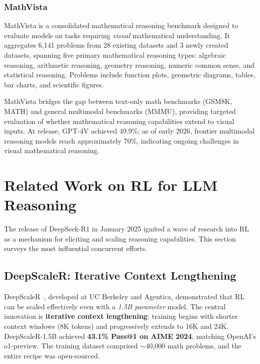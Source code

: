 \documentclass[12pt,a4paper]{report}
\theoremstyle{definition}
\begin{document}
\subsubsection{MathVista}

MathVista \cite{lu2024mathvista} is a consolidated mathematical reasoning benchmark designed to evaluate models on tasks requiring \emph{visual} mathematical understanding. It aggregates 6,141 problems from 28 existing datasets and 3 newly created datasets, spanning five primary mathematical reasoning types: algebraic reasoning, arithmetic reasoning, geometry reasoning, numeric common sense, and statistical reasoning. Problems include function plots, geometric diagrams, tables, bar charts, and scientific figures.

MathVista bridges the gap between text-only math benchmarks (GSM8K, MATH) and general multimodal benchmarks (MMMU), providing targeted evaluation of whether mathematical reasoning capabilities extend to visual inputs. At release, GPT-4V achieved 49.9\%; as of early 2026, frontier multimodal reasoning models reach approximately 70\%, indicating ongoing challenges in visual mathematical reasoning.


\section{Related Work on RL for LLM Reasoning}
\label{sec:related-work-rl-reasoning}

The release of DeepSeek-R1 in January 2025 ignited a wave of research into RL as a mechanism for eliciting and scaling reasoning capabilities. This section surveys the most influential concurrent efforts.

\subsection{DeepScaleR: Iterative Context Lengthening}

DeepScaleR~\cite{luo2025deepscaler}, developed at UC Berkeley and Agentica, demonstrated that RL can be scaled effectively even with a \emph{1.5B parameter} model. The central innovation is \textbf{iterative context lengthening}: training begins with shorter context windows (8K tokens) and progressively extends to 16K and 24K. DeepScaleR-1.5B achieved \textbf{43.1\% Pass@1 on AIME 2024}, matching OpenAI's o1-preview. The training dataset comprised $\sim$40,000 math problems, and the entire recipe was open-sourced.
\end{document}
